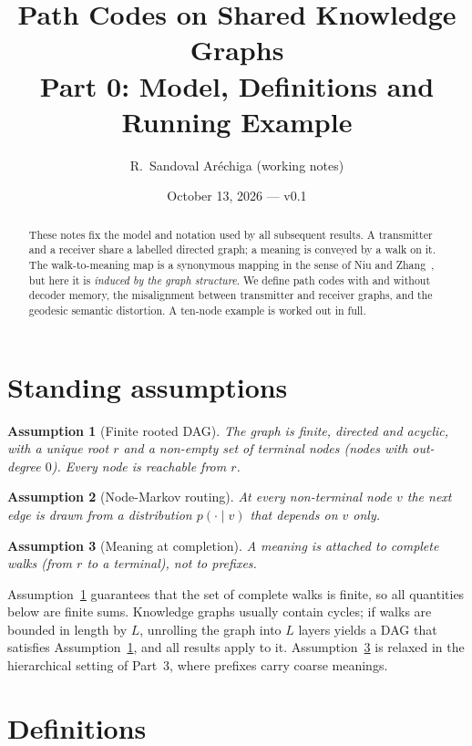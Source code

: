\documentclass[11pt]{article}
\title{Path Codes on Shared Knowledge Graphs\\[2pt]\large Part 0: Model, Definitions and Running Example}
\author{R.~Sandoval Ar\'echiga (working notes)}
\date{October 13, 2026 --- v0.1}
\newtheorem{assumption}{Assumption}
\theoremstyle{remark}
\begin{document}
\maketitle

\begin{abstract}
These notes fix the model and notation used by all subsequent results. A transmitter and a receiver share a labelled directed graph; a meaning is conveyed by a walk on it. The walk-to-meaning map is a synonymous mapping in the sense of Niu and Zhang~\cite{niu2025}, but here it is \emph{induced by the graph structure}. We define path codes with and without decoder memory, the misalignment between transmitter and receiver graphs, and the geodesic semantic distortion. A ten-node example is worked out in full.
\end{abstract}

\section{Standing assumptions}

\begin{assumption}[Finite rooted DAG]\label{as:dag}
The graph is finite, directed and acyclic, with a unique root $r$ and a non-empty set of terminal nodes (nodes with out-degree $0$). Every node is reachable from $r$.
\end{assumption}

\begin{assumption}[Node-Markov routing]\label{as:markov}
At every non-terminal node $v$ the next edge is drawn from a distribution $p(\cdot\mid v)$ that depends on $v$ only.
\end{assumption}

\begin{assumption}[Meaning at completion]\label{as:meaning}
A meaning is attached to complete walks (from $r$ to a terminal), not to prefixes.
\end{assumption}

Assumption~\ref{as:dag} guarantees that the set of complete walks is finite, so all quantities below are finite sums. Knowledge graphs usually contain cycles; if walks are bounded in length by $L$, unrolling the graph into $L$ layers yields a DAG that satisfies Assumption~\ref{as:dag}, and all results apply to it. Assumption~\ref{as:meaning} is relaxed in the hierarchical setting of Part~3, where prefixes carry coarse meanings.

\section{Definitions}
\end{document}
